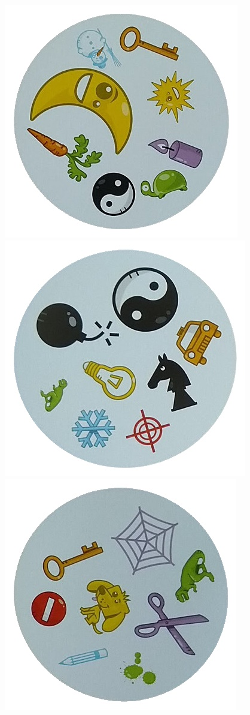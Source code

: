 \documentclass[10pt,a4paper]{article}
\begin{document}
\begin{center}
\includegraphics[scale=0.25]{2.1/card2.jpg}
\includegraphics[scale=0.25]{2.1/card3.jpg}
\includegraphics[scale=0.25]{2.1/card4.jpg}

\end{center}
\end{document}
